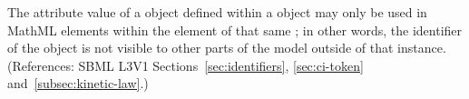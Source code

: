 The  attribute value of a \LocalParameter object defined within a
\KineticLaw object may only be used in MathML  elements within
the  element of that same \KineticLaw; in other words, the
identifier of the \LocalParameter object is not visible to other parts of
the model outside of that \KineticLaw instance.  (References: SBML L3V1
Sections~\ref{sec:identifiers}, \ref{sec:ci-token}
and~\ref{subsec:kinetic-law}.)
